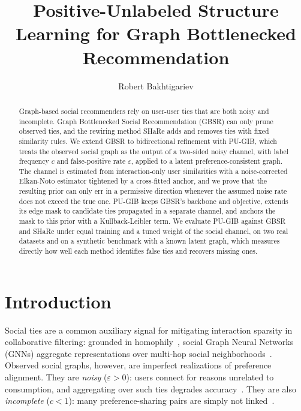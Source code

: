 \documentclass[sigconf]{acmart}
\begin{document}
\title{Positive-Unlabeled Structure Learning for Graph Bottlenecked Recommendation}

\author{Robert Bakhtigariev}

\begin{abstract}
Graph-based social recommenders rely on user-user ties that are both noisy and incomplete. Graph Bottlenecked Social Recommendation (GBSR) can only prune observed ties, and the rewiring method SHaRe adds and removes ties with fixed similarity rules. We extend GBSR to bidirectional refinement with PU-GIB, which treats the observed social graph as the output of a two-sided noisy channel, with label frequency $c$ and false-positive rate $\varepsilon$, applied to a latent preference-consistent graph. The channel is estimated from interaction-only user similarities with a noise-corrected Elkan-Noto estimator tightened by a cross-fitted anchor, and we prove that the resulting prior can only err in a permissive direction whenever the assumed noise rate does not exceed the true one. PU-GIB keeps GBSR's backbone and objective, extends its edge mask to candidate ties propagated in a separate channel, and anchors the mask to this prior with a Kullback-Leibler term. We evaluate PU-GIB against GBSR and SHaRe under equal training and a tuned weight of the social channel, on two real datasets and on a synthetic benchmark with a known latent graph, which measures directly how well each method identifies false ties and recovers missing ones.
\end{abstract}


\maketitle

\section{Introduction}
Social ties are a common auxiliary signal for mitigating interaction sparsity in collaborative filtering: grounded in homophily~\cite{mcpherson2001birds}, social Graph Neural Networks (GNNs) aggregate representations over multi-hop social neighborhoods~\cite{10.1145/3308558.3313488, 9311623}. Observed social graphs, however, are imperfect realizations of preference alignment. They are \emph{noisy} ($\varepsilon > 0$): users connect for reasons unrelated to consumption, and aggregating over such ties degrades accuracy~\cite{10.1145/3543507.3583374, 10.1145/3637528.3671807, 10.1145/3696410.3714874}. They are also \emph{incomplete} ($c < 1$): many preference-sharing pairs are simply not linked~\cite{10.1609/aaai.v39i17.33966}.
\end{document}
